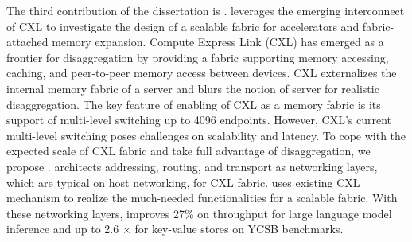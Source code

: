 The third contribution of the dissertation is \aurelia. 
\aurelia leverages the emerging interconnect of CXL to investigate the design of a scalable fabric for accelerators and fabric-attached memory expansion.
%
Compute Express Link (CXL) has emerged as a frontier for disaggregation by providing a fabric supporting memory accessing, caching, and peer-to-peer memory access between devices.
%
CXL externalizes the internal memory fabric of a server and blurs the notion of server for realistic disaggregation.
%
The key feature of enabling of CXL as a memory fabric is its support of multi-level switching up to 4096 endpoints.
%
However, CXL's current multi-level switching poses challenges on scalability and latency. 
%
To cope with the expected scale of CXL fabric and take full advantage of disaggregation, we propose \aurelia.
%
\aurelia architects addressing, routing, and transport as networking layers, which are typical on host networking, for CXL fabric.
%
\aurelia uses existing CXL mechanism to realize the much-needed functionalities for a scalable fabric.
%
With these networking layers, \aurelia improves 27\% on throughput for large language model inference and up to 2.6 $\times$ for key-value stores on YCSB benchmarks.